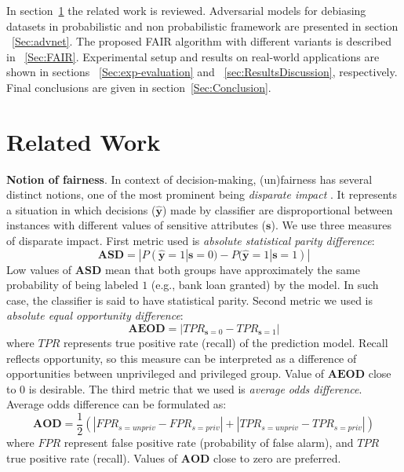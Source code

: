 \documentclass[preprint,12pt]{elsarticle}
\begin{document}
In section~\ref{Sec:Related Work} the related work is reviewed. Adversarial models for debiasing datasets in probabilistic and non probabilistic framework are presented in section ~\ref{Sec:advnet}. The proposed FAIR algorithm with different variants is described in ~\ref{Sec:FAIR}.
Experimental setup and results on real-world applications are shown in sections ~\ref{Sec:exp-evaluation} and ~\ref{sec:ResultsDiscussion}, respectively. Final conclusions are given in section~\ref{Sec:Conclusion}.


\section{Related Work}
\label{Sec:Related Work}

\textbf{Notion of fairness}. In context of decision-making, (un)fairness has several distinct notions, one of the most prominent being {\em disparate impact} \cite{barocas2016big}. It represents a situation in which decisions ($\hat{\mathbf{y}}$) made by classifier are disproportional between instances with different values of sensitive attributes ($\mathbf{s}$). We use three measures of disparate impact. First metric used is \textit{absolute statistical parity difference}:
\begin{equation}
\mathbf{ASD} = |P(\hat{\mathbf{y}}=1|\mathbf{s}=0) - P(\hat{\mathbf{y}}=1|\mathbf{s}=1)|
\label{metric:asd}
\end{equation}
Low values of $\mathbf{ASD}$ mean that both groups have approximately the same probability of being labeled $1$ (e.g., bank loan granted) by the model. In such case, the classifier is said to have statistical parity.
Second metric we used is \textit{absolute equal opportunity difference}:
\begin{equation}
\mathbf{AEOD} = |TPR_{\mathbf{s}=0} - TPR_{\mathbf{s}=1}|
\label{metric:aeod}
\end{equation}
where $TPR$ represents true positive rate (recall) of the prediction model. Recall reflects opportunity, so this measure can be interpreted as a difference of opportunities between unprivileged and privileged group. Value of $\mathbf{AEOD}$ close to 0 is desirable. The third metric that we used is \textit{average odds difference}. Average odds difference can be formulated as:
\begin{equation}
\mathbf{AOD} = \frac{1}{2}(|FPR_{s=unpriv} - FPR_{s=priv}| + |TPR_{s=unpriv} - TPR_{s=priv}|)
\label{metric:aod}
\end{equation}
where $FPR$ represent false positive rate (probability of false alarm), and $TPR$ true positive rate (recall). Values of $\mathbf{AOD}$ close to zero are preferred.
\end{document}
